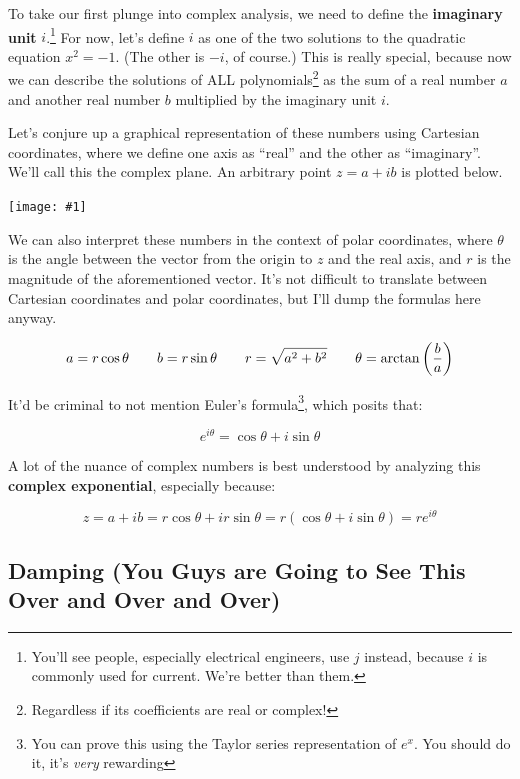 \documentclass{article}
\newcommand{\bicture}[1]{
\begin{center}
    {\texttt{[image: \#1]}}
\end{center}}
\begin{document}
\begin{onehalfspacing}
\begin{flushleft}
\medskip

To take our first plunge into complex analysis, we need to define the \textbf{imaginary unit} \(i\).\footnote{You'll see people, especially electrical engineers, use \(j\) instead, because \(i\) is commonly used for current. We're better than them.} For now, let's define \(i\) as one of the two solutions to the quadratic equation \(x^2 = -1\). (The other is \(-i\), of course.) This is really special, because now we can describe the solutions of ALL polynomials\footnote{Regardless if its coefficients are real or complex!} as the sum of a real number \(a\) and another real number \(b\) multiplied by the imaginary unit \(i\).

\medskip

Let's conjure up a graphical representation of these numbers using Cartesian coordinates, where we define one axis as ``real'' and the other as ``imaginary''. We'll call this the complex plane. An arbitrary point \(z = a+ ib\) is plotted below.

\bicture{2_cpx}

We can also interpret these numbers in the context of polar coordinates, where \(\theta\) is the angle between the vector from the origin to \(z\) and the real axis, and \(r\) is the magnitude of the aforementioned vector. It's not difficult to translate between Cartesian coordinates and polar coordinates, but I'll dump the formulas here anyway.

\vspace{-0.1in}
\[a = r \cos{\theta} \qquad b = r \sin{\theta} \qquad r = \sqrt{a^2 + b^2} \qquad \theta = \arctan\qty({\frac{b}{a}})\]

It'd be criminal to not mention Euler's formula\footnote{You can prove this using the Taylor series representation of \(e^{x}\). You should do it, it's \textit{very} rewarding}, which posits that:

\vspace{-0.1in}
\[e^{i\theta} = \cos{\theta} + i \sin{\theta}\]

A lot of the nuance of complex numbers is best understood by analyzing this \textbf{complex exponential}, especially because:

\vspace{-0.1in}
\[z = a+ib = r\cos{\theta} + ir \sin{\theta} = r (\cos{\theta} + i \sin{\theta}) = re^{i\theta}\]

\subsection{Damping (You Guys are Going to See This Over and Over and Over)}


\end{flushleft}
\end{onehalfspacing}
\end{document}
